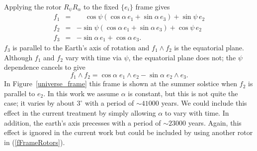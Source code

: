\documentclass[12pt]{article}
\newcommand{\nn}{\nonumber}
\newcommand{\wdg}{\! \wedge \!}
\begin{document}
%
Applying the rotor $R_\psi R_\alpha$ to the fixed $\{e_i\}$ frame gives
%
\begin{eqnarray}
f_1 & = & \phantom{-}\cos\psi( \cos\alpha \,e_1 + \sin\alpha \,e_3 ) + \sin\psi \,e_2\\ \nn
f_2 & = & - \sin\psi( \cos\alpha \,e_1 + \sin\alpha \,e_3 ) + \cos\psi \,e_2\\ \nn
f_3 & = & -\sin\alpha \,e_1 + \cos\alpha \,e_3.
\end{eqnarray}
%
$f_3$ is parallel to the Earth's axis of rotation and $f_1 \wdg f_2$ is the equatorial plane. Although $f_1$ and $f_2$ vary with time via $\psi$, the equatorial plane does not; the $\psi$ dependence cancels to give
%
\begin{equation}
 f_1 \wdg f_2 = \cos\alpha \; e_1 \wdg e_2 - \sin\alpha \; e_2 \wdg e_3.
\end{equation}
%
In Figure~\ref{universe_frame} this frame is shown at the summer solstice when $f_2$ is parallel to $e_2$. In this work we assume $\alpha$ is constant, but this is not quite the case; it varies by about $3^\circ$ with a period of $\sim41000$ years. We could include this effect in the current treatment by simply allowing $\alpha$ to vary with time. In addition, the earth's axis precesses with a period of $\sim23000$ years. Again, this effect is ignored in the current work but could be included by using another rotor in (\ref{fFrameRotors}).
\end{document}
